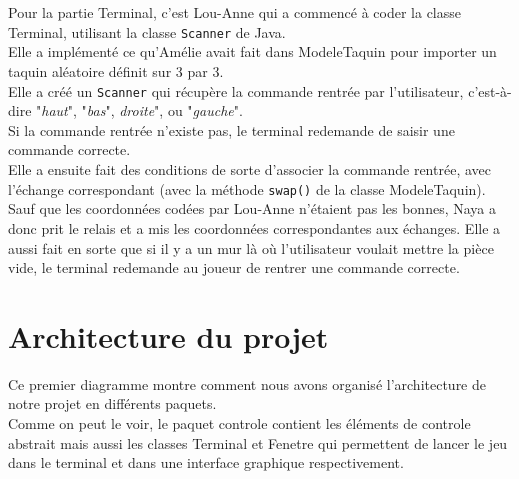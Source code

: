 \documentclass[french,12pt]{article}
\begin{document}
\\\\
Pour la partie Terminal, c'est Lou-Anne qui a commencé à coder la classe \textsf{Terminal}, utilisant la classe \texttt{Scanner} de Java.\\
Elle a implémenté ce qu'Amélie avait fait dans \textsf{ModeleTaquin} pour importer un taquin aléatoire définit sur 3 par 3.\\
Elle a créé un \texttt{Scanner} qui récupère la commande rentrée par l'utilisateur, c'est-à-dire "\textit{haut}", "\textit{bas}", \textit{droite}", ou "\textit{gauche}".\\
Si la commande rentrée n'existe pas, le terminal redemande de saisir une commande correcte. \\
Elle a ensuite fait des conditions de sorte d'associer la commande rentrée, avec l'échange correspondant (avec la méthode \texttt{swap()} de la classe \textsf{ModeleTaquin}). Sauf que les coordonnées codées par Lou-Anne n'étaient pas les bonnes, Naya a donc prit le relais et a mis les coordonnées correspondantes aux échanges. Elle a aussi fait en sorte que si il y a un mur là où l'utilisateur voulait mettre la pièce vide, le terminal redemande au joueur de rentrer une commande correcte.\\

\section{Architecture du projet}

Ce premier diagramme montre comment nous avons organisé l'architecture de notre projet en différents paquets.\\
Comme on peut le voir, le paquet \textsf{controle} contient les éléments de controle abstrait mais aussi les classes \textsf{Terminal} et \textsf{Fenetre} qui permettent de lancer le jeu dans le terminal et dans une interface graphique respectivement.
\end{document}
